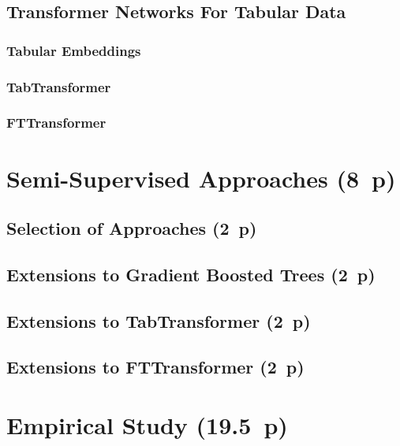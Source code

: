 \subsection{Transformer Networks For Tabular Data}\label{sec:tabular-transformer}

\subsubsection{Tabular Embeddings}\label{sec:tabular-embeddings}

\subsubsection{TabTransformer}\label{sec:tabtransformer}

\subsubsection{FTTransformer}\label{sec:fttransformer}


\newpage
\section{Semi-Supervised Approaches (8~p)}\label{sec:semi-supervised-approaches}

\subsection{Selection of Approaches (2~p)}\label{sec:selection-of-approaches-1}

\subsection{Extensions to Gradient Boosted
  Trees (2~p)}\label{sec:extensions-to-gradient-boosted-trees}

\subsection{Extensions to TabTransformer (2~p)}\label{sec:extensions-to-tabtransformer}

\subsection{Extensions to FTTransformer (2~p)}\label{sec:extensions-to-fttransformer}


\newpage
\section{Empirical Study (19.5~p)}\label{sec:empirical-study}

